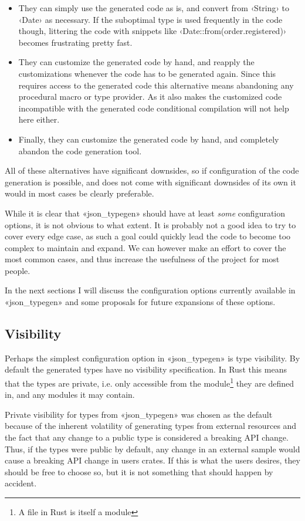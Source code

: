 \begin{itemize}
  \item They can simply use the generated code as is, and convert from ‹String› to ‹Date› as necessary. If the suboptimal type is used frequently in the code though, littering the code with snippets like ‹Date::from(order.registered)› becomes frustrating pretty fast.
  \item They can customize the generated code by hand, and reapply the customizations whenever the code has to be generated again. Since this requires access to the generated code this alternative means abandoning any procedural macro or type provider. As it also makes the customized code incompatible with the generated code conditional compilation will not help here either.
  \item Finally, they can customize the generated code by hand, and completely abandon the code generation tool.
\end{itemize}

All of these alternatives have significant downsides, so if configuration of the code generation is possible, and does not come with significant downsides of its own it would in most cases be clearly preferable.

While it is clear that «json_typegen» should have at least \emph{some} configuration options, it is not obvious to what extent. It is probably not a good idea to try to cover every edge case, as such a goal could quickly lead the code to become too complex to maintain and expand. We can however make an effort to cover the most common cases, and thus increase the usefulness of the project for most people.

In the next sections I will discuss the configuration options currently available in «json_typegen» and some proposals for future expansions of these options.

\subsection{Visibility}

Perhaps the simplest configuration option in «json_typegen» is type visibility. By default the generated types have no visibility specification. In Rust this means that the types are private, i.e. only accessible from the module\footnote{A file in Rust is itself a module} they are defined in, and any modules it may contain.

Private visibility for types from «json_typegen» was chosen as the default because of the inherent volatility of generating types from external resources and the fact that any change to a public type is considered a breaking API change. Thus, if the types were public by default, any change in an external sample would cause a breaking API change in users crates. If this is what the users desires, they should be free to choose so, but it is not something that should happen by accident.

